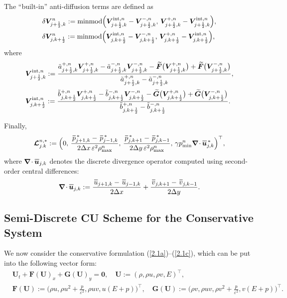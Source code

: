 \documentclass[A4paper,12pt,twoside]{article}
\numberwithin{equation}{section}
\numberwithin{figure}{section}
\numberwithin{table}{section}
\def\bnabla{\bm{\nabla}}
\newcommand{\dx}{\Delta x}
\newcommand{\dy}{\Delta y}
\newcommand{\kph}{{k+\frac{1}{2}}}
\newcommand{\jph}{{j+\frac{1}{2}}}
\newcommand{\mF}{\bm{F}}
\newcommand{\mG}{\bm{G}}
\newcommand{\ve}{\varepsilon}
\newcommand\eref[1]{(\ref{#1})}
\newcommand*\xbar[1]{%
  \hbox{%
    \vbox{%
      \hrule height 0.5pt %
      \kern0.4ex%
      \hbox{%
        \kern-0.05em%
        \ensuremath{#1}%
        \kern-0.00em%
      }%
    }%
  }%
}
\newcommand{\lore}[1]{{\leavevmode\color{red} #1}}
\begin{document}
The ``built-in'' anti-diffusion terms are \lore{defined as}
$$
\begin{aligned}
&\delta\bm V_{\jph,k}^n:={\rm minmod}\Big(\bm V_{\jph,k}^{{\rm int},n}-\bm V^{-,n}_{\jph,k},\,
\bm V^{+,n}_{\jph,k}-\bm V_{\jph,k}^{{\rm int},n}\Big),\\
&\delta\bm V_{j,\kph}^n:={\rm minmod}\Big(\bm V_{j,\kph}^{{\rm int},n}-\bm V^{-,n}_{j,\kph},\,
\bm V^{+,n}_{j,\kph}-\bm V_{j,\kph}^{{\rm int},n}\Big),
\end{aligned}
$$
where 
$$
\begin{aligned}
&\bm V_{\jph,k}^{{\rm int},n}:=\frac{\tilde a^{+,n}_{\jph,k}\bm V^{+,n}_{\jph,k}-\tilde a^{-,n}_{\jph,k}\bm V^{-,n}_{\jph,k}
-\widetilde{\bm F}\big(\bm V^{+,n}_{\jph,k}\big)+\widetilde{\bm F}\big(\bm V^{-,n}_{\jph,k}\big)}
{\tilde a^{+,n}_{\jph,k}-\tilde a^{-,n}_{\jph,k}},\\[0.3ex]
&\bm V_{j,\kph}^{{\rm int},n}:=\frac{\tilde b^{+,n}_{j,\kph}\bm V^{+,n}_{j,\kph}-\tilde b^{-,n}_{j,\kph}\bm V^{-,n}_{j,\kph}
-\widetilde{\bm G}\big(\bm V^{+,n}_{j,\kph}\big)+\widetilde{\bm G}\big(\bm V^{-,n}_{j,\kph}\big)}
{\tilde b^{+,n}_{j,\kph}-\tilde b^{-,n}_{j,\kph}}.
\end{aligned}
$$

Finally,
\begin{equation}
\bm{{\cal L}}^{n,*}_{j.k}:=\Big(0,\,\frac{\,\xbar p_{j+1,k}^{\,*}-\,\xbar p_{j-1,k}^{\,*}}{2\dx\,\ve^2\rho_{\max}^n},\,
\frac{\,\xbar p_{j,k+1}^{\,*}-\,\xbar p_{j,k-1}^{\,*}}{2\dy\,\ve^2\rho_{\max}^n},\,
\gamma p_{\min}^n\bnabla\!\cdot\xbar{\bm u}_{j,k}^{\,*}\Big)^\top,
\label{4.48b}
\end{equation}
where $\bnabla\!\cdot\xbar{\bm u}_{j,k}$ \lore{denotes} the discrete divergence operator computed using %
second-order central differences:
\begin{equation}
\bnabla\!\cdot\xbar{\bm u}_{j,k}:=\frac{\,\xbar u_{j+1,k}-\,\xbar u_{j-1,k}}{2\dx}+\frac{\,\xbar v_{j,k+1}-\,\xbar v_{j,k-1}}{2\dy}.
\label{3.38f}
\end{equation}

\subsection{Semi-Discrete CU Scheme for the Conservative System}\label{sec42}
We now consider the conservative formulation \eref{2.1a}--\eref{2.1c}, which can be \lore{put} into the following vector form:
\begin{equation}
\begin{aligned}
&\bm U_t+\mF(\bm U)_x+\mG(\bm U)_y=\bm0,\quad\bm U:=(\rho,\rho u,\rho v,E)^\top,\\
&\mF(\bm U):=\Big(\rho u,\rho u^2+\frac{p}{\ve^2},\rho uv,u(E+p)\Big)^\top,\quad
\mG(\bm U):=\Big(\rho v,\rho uv,\rho v^2+\frac{p}{\ve^2},v(E+p)\Big)^\top.
\end{aligned}
\label{3.39g}
\end{equation}
\end{document}
